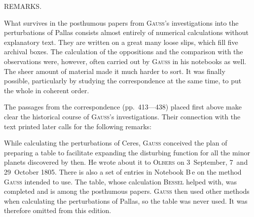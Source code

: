 \clearpage
\begingroup
{}
\renewcommand{\headrulewidth}{0pt}
\begin{center}\large REMARKS.\end{center}
\begingroup
\newcommand{\BIntroJ}{\text{\mdseries\AstroSymbols ♃}}
\newcommand{\BIntroP}{\text{\mdseries\AstroSymbols ⚴}}

\par\noindent\hspace*{\parindent}What survives in the posthumous papers from \textsc{Gauss}'s investigations into the perturbations of Pallas consists almost entirely of
numerical calculations without explanatory text. They are written on a great many loose slips,
which fill five archival boxes. The calculation of the oppositions and the comparison with the
observations were, however, often carried out by \textsc{Gauss} in his notebooks as well. The sheer amount of
material made it much harder to sort. It was finally possible, particularly by studying
the correspondence at the same time, to put the whole in coherent order.

\par\noindent\hspace*{\parindent}The passages from the correspondence (pp.~413—438) placed first above
make clear the historical course of \textsc{Gauss}'s investigations. Their connection with the text
printed later calls for the following remarks:

\medskip
\par\noindent\hspace*{\parindent}While calculating the perturbations of Ceres, \textsc{Gauss} conceived the plan of preparing a table
to facilitate expanding the disturbing function for all the minor planets discovered by then.
He wrote about it to \textsc{Olbers} on 3~September, 7~and 29~October 1805. There is also
a set of entries in Notebook B\,e on the method \textsc{Gauss} intended to use.
The table, whose calculation \textsc{Bessel} helped with, was completed and is among the posthumous papers.
\textsc{Gauss} then used other methods when calculating the perturbations of Pallas,
so the table was never used. It was therefore omitted from this edition.

